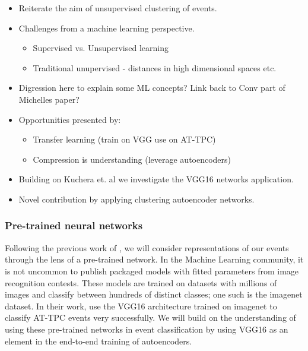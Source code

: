 \documentclass[preprint,12pt]{elsarticle}
\begin{document}
\begin{itemize}
    \item Reiterate the aim of unsupervised  clustering of events.
    \item Challenges from a machine learning perspective. 
    \begin{itemize}
        \item Supervised vs. Unsupervised learning
        \item Traditional unupervised - distances in high dimensional spaces etc. 
    \end{itemize}
    \item Digression here to explain some ML concepts? Link back to Conv part of Michelles paper? 
    \item Opportunities presented by: 
    \begin{itemize}
        \item Transfer learning (train on VGG use on AT-TPC)
        \item Compression is understanding (leverage autoencoders) 
    \end{itemize}
    \item Building on Kuchera et. al we investigate the VGG16 networks application. 
    \item Novel contribution by applying clustering autoencoder networks. 
\end{itemize}

\subsubsection{Pre-trained neural networks}

Following the previous work of \citet{Kuchera2019}, we will consider representations of our events through the lens of a pre-trained network. In the Machine Learning community, it is not uncommon to publish packaged models with fitted parameters from image recognition contests. These models are trained on datasets with millions of images and classify between hundreds of distinct classes; one such is the imagenet dataset. In their work, \citet{Kuchera2019} use the VGG16 architecture trained on imagenet to classify AT-TPC events very successfully.  We will build on the understanding of using these pre-trained networks in event classification by using VGG16 as an element in the end-to-end training of autoencoders. 
\end{document}
